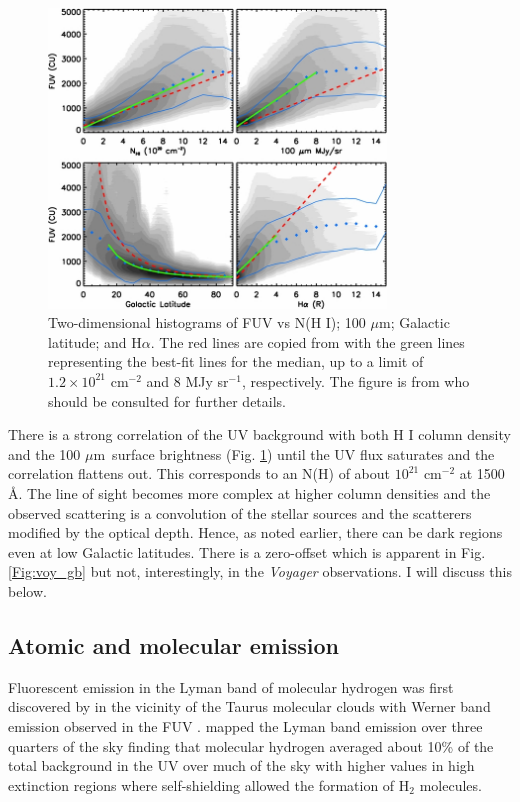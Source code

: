 \documentclass{iau}
\newcommand\micron{\mbox{$\mu$m}}%
\newcommand{\voyager}{{\it Voyager }}
\begin{document}
\begin{figure}[t]
\begin{center}
 \includegraphics[width=0.8\textwidth]{hamden_uv_corr.jpg} 
 \caption{Two-dimensional histograms of FUV vs N(H I); 100 \micron; Galactic latitude; and H$\alpha$. The red lines are copied from \citet{Seon2011} with the green lines representing the best-fit lines for the median, up to a limit of $1.2 \times 10^{21}$ cm$^{-2}$ and 8 MJy sr$^{-1}$, respectively. The figure is from \citet{Hamden2013} who should be consulted for further details.}
  \label{Fig:uv_ir}
\end{center}
\end{figure}

There is a strong correlation of the UV background with both H I column density and the 100 \micron\ surface brightness (Fig. \ref{Fig:uv_ir}) until the UV flux saturates and the correlation flattens out. This corresponds to an N(H) of about $10^{21}$ cm$^{-2}$ at 1500 \AA. The line of sight becomes more complex at higher column densities and the observed scattering is a convolution of the stellar sources and the scatterers modified by the optical depth. Hence, as noted earlier, there can be dark regions even at low Galactic latitudes. There is a zero-offset which is apparent in Fig. \ref{Fig:voy_gb} but not, interestingly, in the \voyager observations. I will discuss this below.

\subsection{Atomic and molecular emission}

Fluorescent emission in the Lyman band of molecular hydrogen was first discovered by \citet{Hurwitz1994} in the vicinity of the Taurus molecular clouds with Werner band emission observed in the FUV \citep{France2004, france2005, France2005b}. \citet{Jo2017} mapped the Lyman band emission over three quarters of the sky finding that molecular hydrogen averaged about 10\% of the total background in the UV over much of the sky with higher values in high extinction regions where self-shielding allowed the formation of H$_{2}$ molecules.
\end{document}
